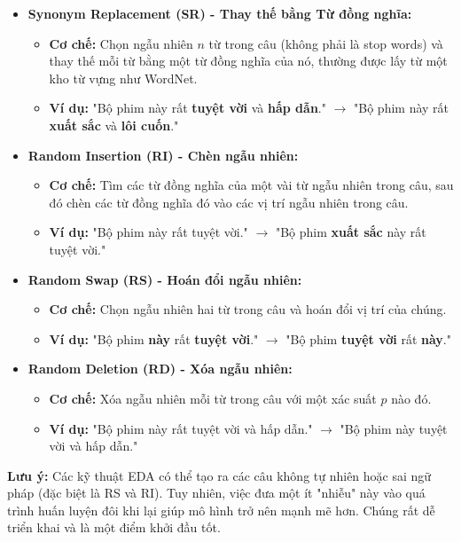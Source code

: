 \begin{itemize}
    \item \textbf{Synonym Replacement (SR) - Thay thế bằng Từ đồng nghĩa:}
        \begin{itemize}
            \item \textbf{Cơ chế:} Chọn ngẫu nhiên $n$ từ trong câu (không phải là stop words) và thay thế mỗi từ bằng một từ đồng nghĩa của nó, thường được lấy từ một kho từ vựng như WordNet.
            \item \textbf{Ví dụ:} "Bộ phim này rất \textbf{tuyệt vời} và \textbf{hấp dẫn}." $\rightarrow$ "Bộ phim này rất \textbf{xuất sắc} và \textbf{lôi cuốn}."
        \end{itemize}
    \item \textbf{Random Insertion (RI) - Chèn ngẫu nhiên:}
        \begin{itemize}
            \item \textbf{Cơ chế:} Tìm các từ đồng nghĩa của một vài từ ngẫu nhiên trong câu, sau đó chèn các từ đồng nghĩa đó vào các vị trí ngẫu nhiên trong câu.
            \item \textbf{Ví dụ:} "Bộ phim này rất tuyệt vời." $\rightarrow$ "Bộ phim \textbf{xuất sắc} này rất tuyệt vời."
        \end{itemize}
    \item \textbf{Random Swap (RS) - Hoán đổi ngẫu nhiên:}
        \begin{itemize}
            \item \textbf{Cơ chế:} Chọn ngẫu nhiên hai từ trong câu và hoán đổi vị trí của chúng.
            \item \textbf{Ví dụ:} "Bộ phim \textbf{này} rất \textbf{tuyệt vời}." $\rightarrow$ "Bộ phim \textbf{tuyệt vời} rất \textbf{này}."
        \end{itemize}
    \item \textbf{Random Deletion (RD) - Xóa ngẫu nhiên:}
        \begin{itemize}
            \item \textbf{Cơ chế:} Xóa ngẫu nhiên mỗi từ trong câu với một xác suất $p$ nào đó.
            \item \textbf{Ví dụ:} "Bộ phim này rất tuyệt vời và hấp dẫn." $\rightarrow$ "Bộ phim này tuyệt vời và hấp dẫn."
        \end{itemize}
\end{itemize}
\textbf{Lưu ý:} Các kỹ thuật EDA có thể tạo ra các câu không tự nhiên hoặc sai ngữ pháp (đặc biệt là RS và RI). Tuy nhiên, việc đưa một ít "nhiễu" này vào quá trình huấn luyện đôi khi lại giúp mô hình trở nên mạnh mẽ hơn. Chúng rất dễ triển khai và là một điểm khởi đầu tốt.

